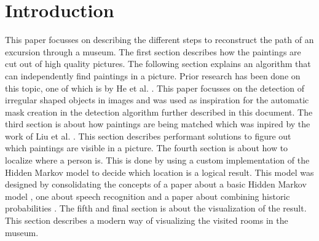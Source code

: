\section*{Introduction}

This paper focusses on describing the different steps to reconstruct the path of an excursion through a museum. The first section describes how the paintings are cut out of high quality pictures. The following section explains an algorithm that can independently find paintings in a picture. Prior research has been done on this topic, one of which is by He et al. \cite{he2019scan}. This paper focusses on the detection of irregular shaped objects in images and was used as inspiration for the automatic mask creation in the detection algorithm further described in this document. The third section is about how paintings are being matched which was inpired by the work of Liu et al. \cite{liu2020image}. This section describes performant solutions to figure out which paintings are visible in a picture. The fourth section is about how to localize where a person is. This is done by using a custom implementation of the Hidden Markov model to decide which location is a logical result. This model was designed by consolidating the concepts of a paper about a basic Hidden Markov model \cite{eddy1996hidden}, one about speech recognition \cite{juang1991hidden} and a paper about combining historic probabilities \cite{genest1986combining}. The fifth and final section is about the visualization of the result. This section describes a modern way of visualizing the visited rooms in the museum.
